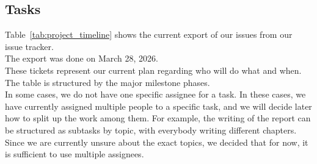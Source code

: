 \documentclass[12pt]{article}
\begin{document}
\clearpage
\subsection{Tasks}

Table~\ref{tab:project_timeline} shows the current export of our issues from our issue tracker.\\The export was done on March 28, 2026. \\

These tickets represent our current plan regarding who will do what and when. The table is structured by the major milestone phases.\\
In some cases, we do not have one specific assignee for a task. In these cases, we have currently assigned multiple people to a specific task, and we will decide later how to split up the work among them. For example, the writing of the report can be structured as subtasks by topic, with everybody writing different chapters. Since we are currently unsure about the exact topics, we decided that for now, it is sufficient to use multiple assignees.
\end{document}
